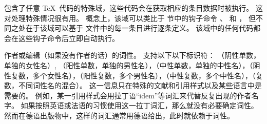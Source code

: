 \begin{fieldlist}



包含了任意 \TeX\ 代码的特殊域，这些代码会在获取相应的条目数据时被执行。
这对处理特殊情况很有用。
概念上，该域可以类比于  节中的钩子命令 、 和 ，
但不同之处在于该域可以基于  文件中的每一条目进行逐条定义。
该域中的任何代码都会在这些钩子命令后立即自动执行。




作者或编辑（如果没有作者的话）的词性。
支持以下以下标识符： （阴性单数，单独的女性名）, （阳性单数，单独的男性名），（中性单数，单独的中性名），（阴性复数，多个女性名），（阳性复数，多个男性名），（中性复数，多个中性名），（复数，不同词性名的混合）。
这一信息只在特殊的文献和引用样式以及某些语言中是需要的。
例如，某一引用样式会用拉丁语“idem”等词汇来代替反复出现的作者名字。
如果按照英语或法语的习惯使用这一拉丁词汇，那么就没有必要确定词性。
然而在德语出版物中，这样的词汇通常用德语给出，此时就依赖于词性。



\end{fieldlist}
